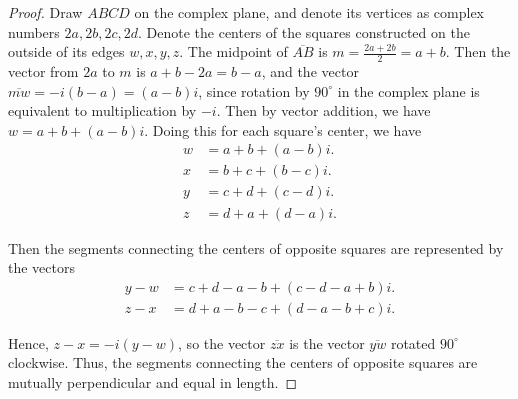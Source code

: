 \documentclass{article}
\begin{document}
\begin{proof}
Draw $ABCD$ on the complex plane, and denote its vertices as complex numbers $2a, 2b, 2c, 2d$. Denote the centers of the squares constructed on the outside of its edges $w,x,y,z$. The midpoint of $\overline{AB}$ is $m=\frac{2a+2b}{2}=a+b$. Then the vector from $2a$ to $m$ is $a+b-2a=b-a$, and the vector $\overline{mw}=-i(b-a)=(a-b)i$, since rotation by $90^{\circ}$ in the complex plane is equivalent to multiplication by $-i$. Then by vector addition, we have $w=a+b+(a-b)i$. Doing this for each square's center, we have
\begin{align*}
    w &=a+b+(a-b)i.\\
    x &=b+c+(b-c)i.\\
    y &=c+d+(c-d)i.\\
    z &=d+a+(d-a)i.
\end{align*}
\par Then the segments connecting the centers of opposite squares are represented by the vectors
\begin{align*}
    y-w&=c+d-a-b+(c-d-a+b)i.\\
    z-x&=d+a-b-c+(d-a-b+c)i.
\end{align*}
\par Hence, $z-x=-i(y-w)$, so the vector $\overline{zx}$ is the vector $\overline{yw}$ rotated $90^{\circ}$ clockwise. Thus, the segments connecting the centers of opposite squares are mutually perpendicular and equal in length.
\end{proof}
\end{document}
